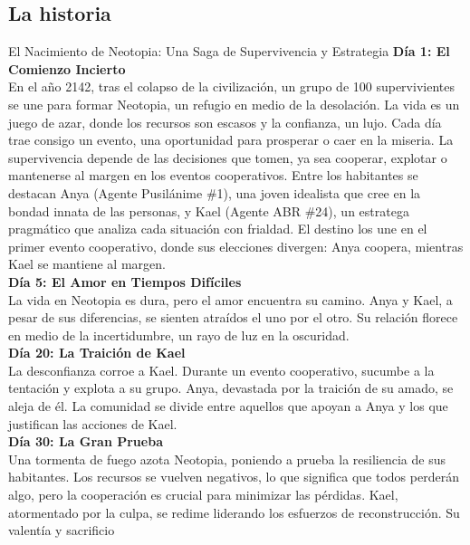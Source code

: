 \documentclass{article}
\begin{document}
\subsection{La historia}
\vspace*{5mm}
\begin{tcolorbox}[enhanced, breakable,skin first=enhanced, skin middle=enhanced, skin last=enhanced]
      El Nacimiento de Neotopia: Una Saga de Supervivencia y Estrategia
      \textbf{Día 1: El Comienzo Incierto}\\
      En el año 2142, tras el colapso de la civilización, un grupo de 100 supervivientes se une para formar Neotopia, un refugio en medio de la desolación. La vida es un
      juego de azar, donde los recursos son escasos y la confianza, un lujo. Cada día trae consigo un evento, una oportunidad para prosperar o caer en la miseria. La
      supervivencia depende de las decisiones que tomen, ya sea cooperar, explotar o mantenerse al margen en los eventos cooperativos. Entre los habitantes se destacan
      Anya (Agente Pusilánime \#1), una joven idealista que cree en la bondad innata de las personas, y Kael (Agente ABR \#24), un estratega pragmático que analiza cada
      situación con frialdad. El destino los une en el primer evento cooperativo, donde sus elecciones divergen: Anya coopera, mientras Kael se mantiene al margen.
      \\\textbf{Día 5: El Amor en Tiempos Difíciles}\\
      La vida en Neotopia es dura, pero el amor encuentra su camino. Anya y Kael, a pesar de sus diferencias, se sienten atraídos el uno por el otro. Su relación florece
      en medio de la incertidumbre, un rayo de luz en la oscuridad.
      \\\textbf{Día 20: La Traición de Kael}\\
      La desconfianza corroe a Kael. Durante un evento cooperativo, sucumbe a la tentación y explota a su grupo. Anya, devastada por la traición de su amado, se aleja de
      él. La comunidad se divide entre aquellos que apoyan a Anya y los que justifican las acciones de Kael.
      \\\textbf{Día 30: La Gran Prueba}\\
      Una tormenta de fuego azota Neotopia, poniendo a prueba la resiliencia de sus habitantes. Los recursos se vuelven negativos, lo que significa que todos perderán algo,
      pero la cooperación es crucial para minimizar las pérdidas. Kael, atormentado por la culpa, se redime liderando los esfuerzos de reconstrucción. Su valentía y sacrificio

\end{tcolorbox}
\end{document}
